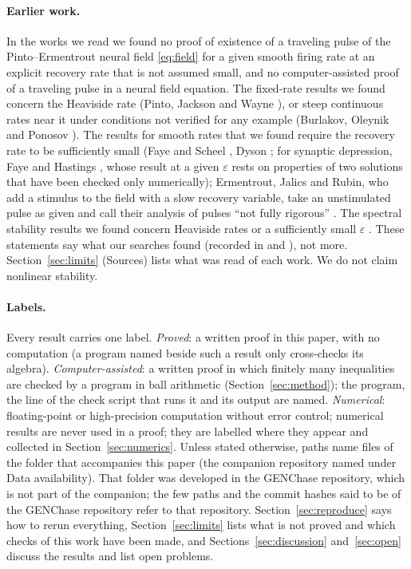 \documentclass[11pt]{article}
\theoremstyle{definition}
\newcommand{\eps}{\varepsilon}
\begin{document}
\paragraph{Earlier work.} In the works we read we found no proof of existence of a traveling pulse of the Pinto--Ermentrout neural field \eqref{eq:field} for a given smooth firing rate at an explicit recovery rate that is not assumed small, and no computer-assisted proof of a traveling pulse in a neural field equation. The fixed-rate results we found concern the Heaviside rate (Pinto, Jackson and Wayne \cite{pjw2005}), or steep continuous rates near it under conditions not verified for any example (Burlakov, Oleynik and Ponosov \cite{bop2025}). The results for smooth rates that we found require the recovery rate to be sufficiently small (Faye and Scheel \cite{fs2015}, Dyson \cite{dyson2018}; for synaptic depression, Faye \cite{faye2013} and Hastings \cite{hastings2017}, whose result at a given $\eps$ rests on properties of two solutions that have been checked only numerically); Ermentrout, Jalics and Rubin, who add a stimulus to the field with a slow recovery variable, take an unstimulated pulse as given and call their analysis of pulses ``not fully rigorous'' \cite[p.~3049]{ejr2010}. The spectral stability results we found concern Heaviside rates \cite{co2004,pjw2005,zhang2004acta} or a sufficiently small $\eps$ \cite{faye2013}. These statements say what our searches found (recorded in  and ), not more. Section~\ref{sec:limits} (Sources) lists what was read of each work. We do not claim nonlinear stability.

\paragraph{Labels.} Every result carries one label. \emph{Proved}: a written proof in this paper, with no computation (a program named beside such a result only cross-checks its algebra). \emph{Computer-assisted}: a written proof in which finitely many inequalities are checked by a program in ball arithmetic (Section~\ref{sec:method}); the program, the line of the check script that runs it and its output are named. \emph{Numerical}: floating-point or high-precision computation without error control; numerical results are never used in a proof; they are labelled where they appear and collected in Section~\ref{sec:numerics}. Unless stated otherwise, paths name files of the folder that accompanies this paper (the companion repository named under Data availability). That folder was developed in the GENChase repository, which is not part of the companion; the few paths and the commit hashes said to be of the GENChase repository refer to that repository. Section~\ref{sec:reproduce} says how to rerun everything, Section~\ref{sec:limits} lists what is not proved and which checks of this work have been made, and Sections~\ref{sec:discussion} and~\ref{sec:open} discuss the results and list open problems.
\end{document}
